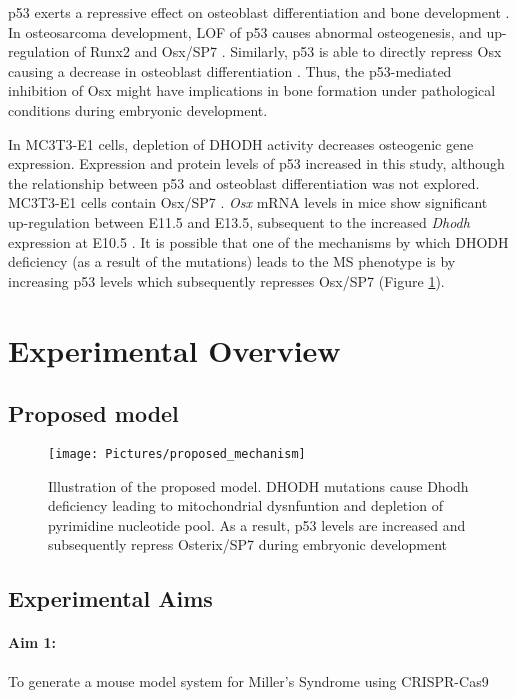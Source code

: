 \documentclass[12pt]{article}
\begin{document}
	p53 exerts a repressive effect on osteoblast differentiation and bone development \citep{ohyama1997p53, wang2006p53}. In osteosarcoma development, LOF of p53 causes abnormal osteogenesis, and up-regulation of Runx2 and Osx/SP7 \citep{berman2008metastatic}. Similarly, p53 is able to directly repress Osx causing a decrease in osteoblast differentiation \citep{p53sp7}.  Thus, the p53-mediated inhibition of Osx might have implications in bone formation under pathological conditions during embryonic development.
	
	In MC3T3-E1 cells, depletion of DHODH activity decreases osteogenic gene expression. Expression and protein levels of p53 increased in this study, although the relationship between p53 and osteoblast differentiation was not explored. MC3T3-E1 cells contain Osx/SP7  \citep{tian2012osterix}. \textit{Osx} mRNA levels in mice show significant up-regulation between E11.5 and E13.5, subsequent to the increased \textit{Dhodh} expression at E10.5 \citep{ gao2004molecular,  kaback2008osterix, doi:10.1093/hmg/dds218}. It is possible that one of the mechanisms by which DHODH deficiency (as a result of the mutations) leads to the MS phenotype is  by increasing p53 levels which subsequently represses Osx/SP7 (Figure \ref{fig:proposedmechanism}). 

\pagebreak
\section{Experimental Overview}
\subsection{Proposed model}

	
\begin{figure}[!htp]
	\centering
	\texttt{[image: Pictures/proposed\_mechanism]}
	\caption{Illustration of the proposed model. DHODH mutations cause Dhodh deficiency leading to mitochondrial dysnfuntion and depletion of pyrimidine nucleotide pool. As a result, p53 levels are increased and subsequently repress Osterix/SP7 during embryonic development}
	\label{fig:proposedmechanism}
\end{figure}

\subsection{Experimental Aims}

\paragraph{Aim 1:} To generate a mouse model system for Miller's Syndrome using CRISPR-Cas9 
\end{document}
